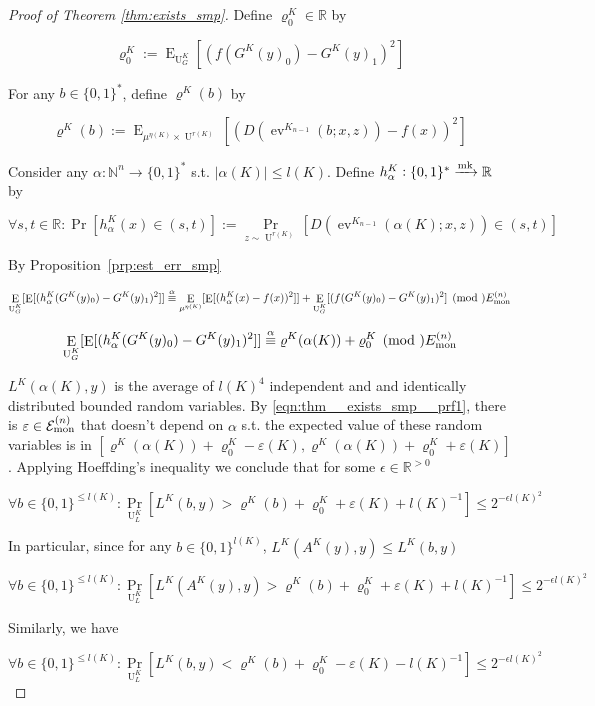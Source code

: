 \documentclass{article}
\numberwithin{equation}{section}
\theoremstyle{definition}
\theoremstyle{plain}
\newcommand{\Bool}{\{0,1\}}
\newcommand{\Words}{{\Bool^*}}
\DeclareMathOperator{\Prb}{Pr}
\DeclareMathOperator{\E}{E}
\DeclareMathOperator{\Ev}{ev}
\DeclareMathOperator{\Un}{U}
\newcommand{\Nats}{\mathbb{N}}
\newcommand{\Reals}{\mathbb{R}}
\newcommand{\Abs}[1]{\lvert #1 \rvert}
\newcommand{\Fall}{\mathcal{E}}
\newcommand{\FallM}{\Fall_{\textnormal{mon}}^{(n)}}
\newcommand{\Markov}{\xrightarrow{\textnormal{mk}}}
\begin{document}
\begin{proof}[Proof of Theorem \ref{thm:exists_smp}]
Define ${\varrho_0^K \in \Reals}$ by

\[\varrho_0^K:=\E_{\Un_G^K}[(f(G^K(y)_0)-G^K(y)_1)^2]\]

For any ${b \in \Words}$, define ${\varrho^K(b)}$ by

\[\varrho^K(b):=\E_{\mu^{\eta(K)} \times \Un^{r(K)}}[(D(\Ev^{K_{n-1}}(b;x,z))-f(x))^2]\]

Consider any ${\alpha: \Nats^n \rightarrow \Words}$ s.t. ${\Abs{\alpha(K)} \leq l(K)}$. Define ${h_\alpha^K: \Words \Markov \Reals}$ by

\[\forall s,t \in \Reals: \Pr[h_\alpha^K(x) \in (s,t)]:=\Prb_{z \sim \Un^{r(K)}}[D(\Ev^{K_{n-1}}(\alpha(K);x,z)) \in (s,t)]\]

By Proposition~\ref{prp:est_err_smp}

\[\E_{\Un_G^K}[\E[(h_\alpha^K(G^K(y)_0)-G^K(y)_1)^2]] \overset{\alpha}{\equiv} \E_{\mu^{\eta(K)}}[\E[(h_\alpha^K(x)-f(x))^2]] + \E_{\Un_G^K}[(f(G^K(y)_0)-G^K(y)_1)^2] \pmod \FallM\]

\begin{equation}
\label{eqn:thm__exists_smp__prf1}
\E_{\Un_G^K}[\E[(h_\alpha^K(G^K(y)_0)-G^K(y)_1)^2]] \overset{\alpha}{\equiv} \varrho^K(\alpha(K)) + \varrho_0^K \pmod \FallM
\end{equation}

${L^K(\alpha(K),y)}$ is the average of ${l(K)^4}$ independent and and identically distributed bounded random variables. By \ref{eqn:thm__exists_smp__prf1}, there is ${\varepsilon \in \FallM}$ that doesn't depend on ${\alpha}$ s.t. the expected value of these random variables is in ${[\varrho^K(\alpha(K)) + \varrho_0^K - \varepsilon(K), \varrho^K(\alpha(K)) + \varrho_0^K + \varepsilon(K)]}$. Applying Hoeffding's inequality we conclude that for some ${\epsilon \in \Reals^{>0}}$

\[\forall b \in \Bool^{\leq l(K)}: \Prb_{\Un_L^K}[L^K(b,y) > \varrho^K(b) + \varrho_0^K  + \varepsilon(K) + l(K)^{-1}] \leq 2^{-\epsilon l(K)^2}\]

In particular, since for any ${b \in \Bool^{l(K)}}$, ${L^K(A^K(y),y) \leq L^K(b,y)}$

\begin{equation}
\label{eqn:thm__exists_smp__prf2}
\forall b \in \Bool^{\leq l(K)}: \Prb_{\Un_L^K}[L^K(A^K(y),y) > \varrho^K(b) + \varrho_0^K + \varepsilon(K) + l(K)^{-1}] \leq 2^{-\epsilon l(K)^2}
\end{equation}

Similarly, we have

\[\forall b \in \Bool^{\leq l(K)}: \Prb_{\Un_L^K}[L^K(b,y) < \varrho^K(b) + \varrho_0^K - \varepsilon(K) - l(K)^{-1}] \leq 2^{-\epsilon l(K)^2}\]


\end{proof}
\end{document}
